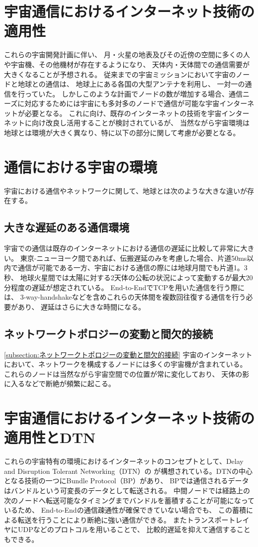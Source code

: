 \section{宇宙通信におけるインターネット技術の適用性}
これらの宇宙開発計画に伴い、 月・火星の地表及びその近傍の空間に多くの人や宇宙機、その他機材が存在するようになり、
天体内・天体間での通信需要が大きくなることが予想される。 
従来までの宇宙ミッションにおいて宇宙のノードと地球との通信は、 地球上にある各国の大型アンテナを利用し、 一対一の通信を行っていた。
しかしこのような計画でノードの数が増加する場合、通信ニーズに対応するためには宇宙にも多対多のノードで通信が可能な宇宙インターネットが必要となる。 
これに向け、既存のインターネットの技術を宇宙インターネットに向け改良し活用することが検討されているが、
当然ながら宇宙環境は地球とは環境が大きく異なり、特に以下の部分に関して考慮が必要となる。

\section{通信における宇宙の環境}
宇宙における通信やネットワークに関して、地球とは次のような大きな違いが存在する。
\subsection{大きな遅延のある通信環境}
宇宙での通信は既存のインターネットにおける通信の遅延に比較して非常に大きい。
東京-ニューヨーク間であれば、伝搬遅延のみを考慮した場合、片道50ms以内で通信が可能である一方、宇宙における通信の際には地球月間でも片道1。3秒、
地球火星間では太陽に対する2天体の公転の状況によって変動するが最大20分程度の遅延が想定されている。
End-to-EndでTCPを用いた通信を行う際には、 3-way-handshakeなどを含めこれらの天体間を複数回往復する通信を行う必要があり、 
遅延はさらに大きな時間になる。 
\cite{McBrayer2022}
\subsection{ネットワークトポロジーの変動と間欠的接続}
\ref{subsection:ネットワークトポロジーの変動と間欠的接続}
宇宙のインターネットにおいて、ネットワークを構成するノードには多くの宇宙機が含まれている。
これらのノードは当然ながら宇宙空間での位置が常に変化しており、
 天体の影に入るなどで断絶が頻繁に起こる。 

\section{宇宙通信におけるインターネット技術の適用性とDTN}
これらの宇宙特有の環境におけるインターネットのコンセプトとして、Delay and Disruption Tolerant Networking（DTN）の
が構想されている。DTNの中心となる技術の一つにBundle Protocol（BP）があり、 
BPでは通信されるデータはバンドルという可変長のデータとして転送される。 
中間ノードでは経路上の次のノードへ転送可能なタイミングまでバンドルを蓄積することが可能になっているため、 
End-to-Endの通信疎通性が確保できていない場合でも、 この蓄積による転送を行うことにより断絶に強い通信ができる。
またトランスポートレイヤにUDPなどのプロトコルを用いることで、 比較的遅延を抑えて通信することもできる。

